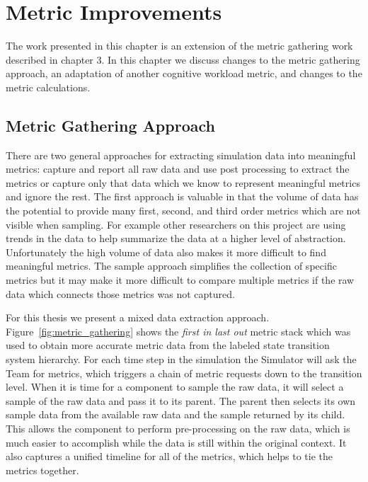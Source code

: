 \chapter{Metric Improvements} \label{ch:metrics}

The work presented in this chapter is an extension of the metric gathering work described in chapter 3.  In this chapter we discuss changes to the metric gathering approach, an adaptation of another cognitive workload metric, and changes to the metric calculations.

\section{Metric Gathering Approach}

There are two general approaches for extracting simulation data into meaningful metrics: capture and report all raw data and use post processing to extract the metrics or capture only that data which we know to represent meaningful metrics and ignore the rest.  The first approach is valuable in that the volume of data has the potential to provide many first, second, and third order metrics which are not visible when sampling.  For example other researchers on this project are using trends in the data to help summarize the data at a higher level of abstraction.  Unfortunately the high volume of data also makes it more difficult to find meaningful metrics.  The sample approach simplifies the collection of specific metrics but it may make it more difficult to compare multiple metrics if the raw data which connects those metrics was not captured.

For this thesis we present a mixed data extraction approach.  Figure~\ref{fig:metric_gathering} shows the \textit{first in last out} metric stack which was used to obtain more accurate metric data from the labeled state transition system hierarchy.  For each time step in the simulation the Simulator will ask the Team for metrics, which triggers a chain of metric requests down to the transition level.  When it is time for a component to sample the raw data, it will select a sample of the raw data and pass it to its parent.  The parent then selects its own sample data from the available raw data and the sample returned by its child.  This allows the component to perform pre-processing on the raw data, which is much easier to accomplish while the data is still within the original context.  It also captures a unified timeline for all of the metrics, which helps to tie the metrics together.  

